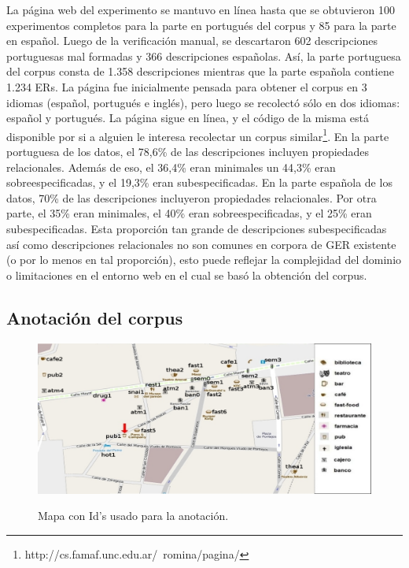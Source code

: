 La p\'agina web del experimento se mantuvo en l\'{i}nea hasta que se obtuvieron 100 experimentos completos para la parte en portugu\'es del corpus y 85  para la parte en espa\~nol. Luego de la verificaci\'on manual, se descartaron 602 descripciones portuguesas mal formadas y 366 descripciones espa\~nolas. As\'{i}, la parte portuguesa del corpus consta de 1.358 descripciones mientras que la parte espa\~nola contiene 1.234 ERs. La p\'agina fue inicialmente pensada para obtener el corpus en 3 idiomas (espa\~nol, portugu\'es e ingl\'es), pero luego se recolect\'o s\'olo en dos idiomas: espa\~nol y portugu\'es. La p\'agina sigue en l\'inea, y el c\'odigo de la misma est\'a disponible por si a alguien le interesa recolectar un corpus similar\footnote{http://cs.famaf.unc.edu.ar/~romina/pagina/}.
En la parte portuguesa de los datos, el 78,6\% de las descripciones incluyen propiedades relacionales. Adem\'as de eso, el 36,4\% eran minimales un 44,3\% eran sobreespecificadas, y el 19,3\% eran subespecificadas. En la parte espa\~nola de los datos, 70\% de las descripciones incluyeron propiedades relacionales. Por otra parte, el 35\% eran minimales, el 40\% eran sobreespecificadas, y el 25\% eran subespecificadas.
Esta proporci\'on tan grande de descripciones subespecificadas as\'{i} como descripciones relacionales no son comunes en corpora de GER existente (o por lo menos en tal proporci\'on), esto puede reflejar la complejidad del dominio o limitaciones en el entorno web en el cual se bas\'o la obtenci\'on del corpus.



\subsection{Anotaci\'on del corpus}
\label{corpus-anotacion}

\begin{figure}[H]
\centering
\includegraphics[width=\textwidth]{figures/mapa-con-ids2.png}\\[0pt]
\caption{Mapa con Id's usado para la anotaci\'on.}
\label{mapa-con-ids}
\end{figure}

